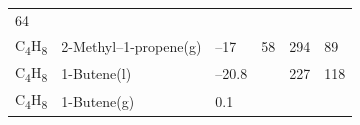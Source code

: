 \documentclass[
]{book}
\theoremstyle{definition}
\theoremstyle{definition}
\theoremstyle{definition}
\theoremstyle{remark}
\begin{document}
\begin{longtable}[]{@{}llllll@{}}
\begin{minipage}[t]{0.14\columnwidth}
64\strut
\end{minipage}\tabularnewline
\begin{minipage}[t]{0.07\columnwidth}\raggedright
C\textsubscript{4}H\textsubscript{8}\strut
\end{minipage} & \begin{minipage}[t]{0.17\columnwidth}\raggedright
2-Methyl--1-propene(g)\strut
\end{minipage} & \begin{minipage}[t]{0.15\columnwidth}\raggedright
--17\strut
\end{minipage} & \begin{minipage}[t]{0.15\columnwidth}\raggedright
58\strut
\end{minipage} & \begin{minipage}[t]{0.14\columnwidth}\raggedright
294\strut
\end{minipage} & \begin{minipage}[t]{0.14\columnwidth}\raggedright
89\strut
\end{minipage}\tabularnewline
\begin{minipage}[t]{0.07\columnwidth}\raggedright
C\textsubscript{4}H\textsubscript{8}\strut
\end{minipage} & \begin{minipage}[t]{0.17\columnwidth}\raggedright
1-Butene(l)\strut
\end{minipage} & \begin{minipage}[t]{0.15\columnwidth}\raggedright
--20.8\strut
\end{minipage} & \begin{minipage}[t]{0.15\columnwidth}\raggedright
\strut
\end{minipage} & \begin{minipage}[t]{0.14\columnwidth}\raggedright
227\strut
\end{minipage} & \begin{minipage}[t]{0.14\columnwidth}\raggedright
118\strut
\end{minipage}\tabularnewline
\begin{minipage}[t]{0.07\columnwidth}\raggedright
C\textsubscript{4}H\textsubscript{8}\strut
\end{minipage} & \begin{minipage}[t]{0.17\columnwidth}\raggedright
1-Butene(g)\strut
\end{minipage} & \begin{minipage}[t]{0.15\columnwidth}\raggedright
0.1\strut
\end{minipage} & \begin{minipage}[t]{0.15\columnwidth}\raggedright

\end{minipage}
\end{longtable}
\end{document}
